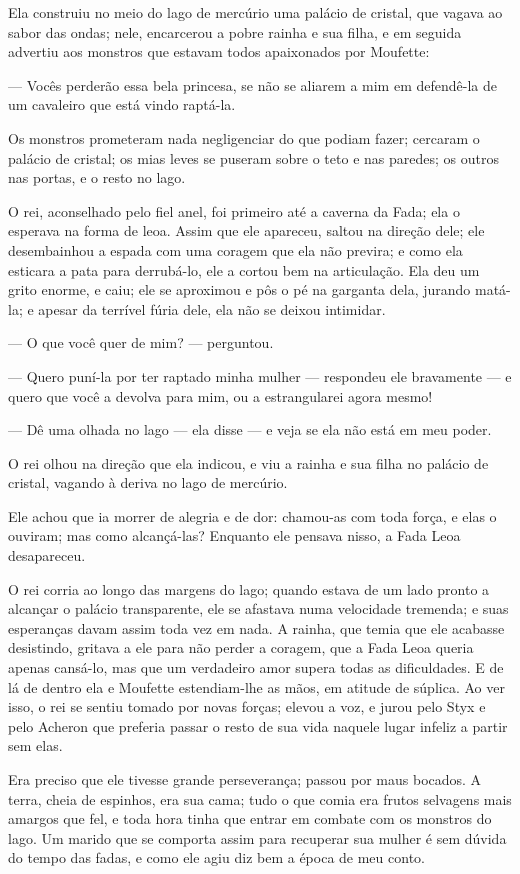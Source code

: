 Ela construiu no meio do lago de mercúrio uma palácio de cristal, que
vagava ao sabor das ondas; nele, encarcerou a pobre rainha e sua
filha, e em seguida advertiu aos monstros que estavam todos
apaixonados por Moufette:

— Vocês perderão essa bela princesa, se não se aliarem a mim em
defendê-la de um cavaleiro que está vindo raptá-la. 

Os monstros prometeram nada negligenciar do que podiam fazer; cercaram
o palácio de cristal; os mias leves se puseram sobre o teto e nas
paredes; os outros nas portas, e o resto no lago. 

O rei, aconselhado pelo fiel anel, foi primeiro até a caverna da Fada;
ela o esperava na forma de leoa. Assim que ele apareceu, saltou na
direção dele; ele desembainhou a espada com uma coragem que ela não
previra; e como ela esticara a pata para derrubá-lo, ele a cortou bem
na articulação. Ela deu um grito enorme, e caiu; ele se aproximou e
pôs o pé na garganta dela, jurando matá-la; e apesar da terrível
fúria dele, ela não se deixou intimidar.

— O que você quer de mim? — perguntou.

— Quero puní-la por ter raptado minha mulher — respondeu ele
bravamente — e quero que você a devolva para mim, ou a estrangularei
agora mesmo!

— Dê uma olhada no lago — ela disse — e veja se ela não está em meu
poder.

O rei olhou na direção que ela indicou, e viu a rainha e sua filha no
palácio de cristal, vagando à deriva no lago de mercúrio. 

Ele achou que ia morrer de alegria e de dor: chamou-as com toda força,
e elas o ouviram; mas como alcançá-las? Enquanto ele pensava nisso, a
Fada Leoa desapareceu.

O rei corria ao longo das margens do lago; quando estava de um lado
pronto a alcançar o palácio transparente, ele se afastava numa
velocidade tremenda; e suas esperanças davam assim toda vez em nada.
A rainha, que temia que ele acabasse desistindo, gritava a ele para
não perder a coragem, que a Fada Leoa queria apenas cansá-lo, mas que
um verdadeiro amor supera todas as dificuldades. E de lá de dentro
ela e Moufette estendiam-lhe as mãos, em atitude de súplica. Ao ver
isso, o rei se sentiu tomado por novas forças; elevou a voz, e jurou
pelo Styx e pelo Acheron que preferia passar o resto de sua vida
naquele lugar infeliz a partir sem elas. 

Era preciso que ele tivesse grande perseverança; passou por maus
bocados. A terra, cheia de espinhos, era sua cama; tudo o que comia
era frutos selvagens mais amargos que fel, e toda hora tinha que
entrar em combate com os monstros do lago. Um marido que se comporta
assim para recuperar sua mulher é sem dúvida do tempo das fadas, e
como ele agiu diz bem a época de meu conto. 

